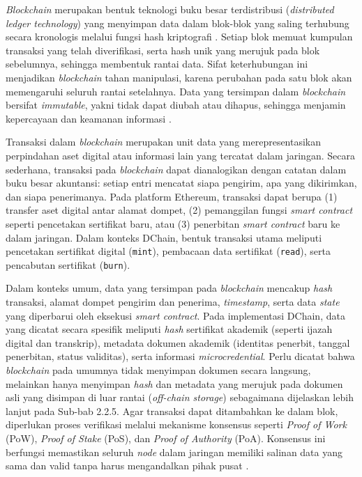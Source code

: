 \textit{Blockchain} merupakan bentuk teknologi buku besar terdistribusi (\textit{distributed ledger technology}) yang menyimpan data dalam blok-blok yang saling terhubung secara kronologis melalui fungsi hash kriptografi \cite{dong2023, judmayer2018}. Setiap blok memuat kumpulan transaksi yang telah diverifikasi, serta hash unik yang merujuk pada blok sebelumnya, sehingga membentuk rantai data. Sifat keterhubungan ini menjadikan \textit{blockchain} tahan manipulasi, karena perubahan pada satu blok akan memengaruhi seluruh rantai setelahnya. Data yang tersimpan dalam \textit{blockchain} bersifat \textit{immutable}, yakni tidak dapat diubah atau dihapus, sehingga menjamin kepercayaan dan keamanan informasi \cite{dong2023, tripathi2023, guo2022}.

Transaksi dalam \textit{blockchain} merupakan unit data yang merepresentasikan perpindahan aset digital atau informasi lain yang tercatat dalam jaringan. Secara sederhana, transaksi pada \textit{blockchain} dapat dianalogikan dengan catatan dalam buku besar akuntansi: setiap entri mencatat siapa pengirim, apa yang dikirimkan, dan siapa penerimanya. Pada platform Ethereum, transaksi dapat berupa (1) transfer aset digital antar alamat dompet, (2) pemanggilan fungsi \textit{smart contract} seperti pencetakan sertifikat baru, atau (3) penerbitan \textit{smart contract} baru ke dalam jaringan. Dalam konteks DChain, bentuk transaksi utama meliputi pencetakan sertifikat digital (\texttt{mint}), pembacaan data sertifikat (\texttt{read}), serta pencabutan sertifikat (\texttt{burn}).

Dalam konteks umum, data yang tersimpan pada \textit{blockchain} mencakup \textit{hash} transaksi, alamat dompet pengirim dan penerima, \textit{timestamp}, serta data \textit{state} yang diperbarui oleh eksekusi \textit{smart contract}. Pada implementasi DChain, data yang dicatat secara spesifik meliputi \textit{hash} sertifikat akademik (seperti ijazah digital dan transkrip), metadata dokumen akademik (identitas penerbit, tanggal penerbitan, status validitas), serta informasi \textit{microcredential}. Perlu dicatat bahwa \textit{blockchain} pada umumnya tidak menyimpan dokumen secara langsung, melainkan hanya menyimpan \textit{hash} dan metadata yang merujuk pada dokumen asli yang disimpan di luar rantai (\textit{off-chain storage}) sebagaimana dijelaskan lebih lanjut pada Sub-bab 2.2.5. Agar transaksi dapat ditambahkan ke dalam blok, diperlukan proses verifikasi melalui mekanisme konsensus seperti \textit{Proof of Work} (PoW), \textit{Proof of Stake} (PoS), dan \textit{Proof of Authority} (PoA). Konsensus ini berfungsi memastikan seluruh \textit{node} dalam jaringan memiliki salinan data yang sama dan valid tanpa harus mengandalkan pihak pusat \cite{judmayer2018, guo2022, monrat2019}.

